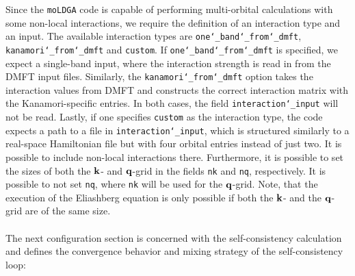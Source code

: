 \documentclass[../../main.tex]{subfiles}
\begin{document}
Since the \texttt{moLDGA} code is capable of performing multi-orbital calculations with some non-local interactions, we require the definition of an interaction type and an input. The available interaction types are \texttt{one\char`_band\char`_from\char`_dmft}, \texttt{kanamori\char`_from\char`_dmft} and \texttt{custom}. If \texttt{one\char`_band\char`_from\char`_dmft} is specified, we expect a single-band input, where the interaction strength is read in from the DMFT input files. Similarly, the \texttt{kanamori\char`_from\char`_dmft} option takes the interaction values from DMFT and constructs the correct interaction matrix with the Kanamori-specific entries. In both cases, the field \texttt{interaction\char`_input} will not be read. Lastly, if one specifies \texttt{custom} as the interaction type, the code expects a path to a file in \texttt{interaction\char`_input}, which is structured similarly to a real-space Hamiltonian file but with four orbital entries instead of just two. It is possible to include non-local interactions there. Furthermore, it is possible to set the sizes of both the $\textbf{k}$- and $\textbf{q}$-grid in the fields \texttt{nk} and \texttt{nq}, respectively. It is possible to not set \texttt{nq}, where \texttt{nk} will be used for the $\textbf{q}$-grid. Note, that the execution of the Eliashberg equation is only possible if both the $\textbf{k}$- and the $\textbf{q}$-grid are of the same size.
\\\\
The next configuration section is concerned with the self-consistency calculation and defines the convergence behavior and mixing strategy of the self-consistency loop:
\end{document}
